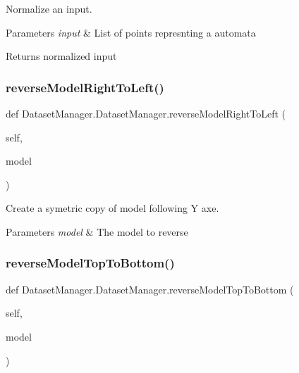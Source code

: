 Normalize an input. 


\begin{DoxyParams}{Parameters}
{\em input} & List of points represnting a automata \\
\hline
\end{DoxyParams}
\begin{DoxyReturn}{Returns}
normalized input 
\end{DoxyReturn}
\mbox{\label{classDatasetManager_1_1DatasetManager_adcd554118e14f508c09e5a1cec76f5c6}} 
\subsubsection{\texorpdfstring{reverseModelRightToLeft()}{reverseModelRightToLeft()}}
{\footnotesize\ttfamily def Dataset\+Manager.\+Dataset\+Manager.\+reverse\+Model\+Right\+To\+Left (\begin{DoxyParamCaption}\item[{}]{self,  }\item[{}]{model }\end{DoxyParamCaption})}



Create a symetric copy of model following Y axe. 


\begin{DoxyParams}{Parameters}
{\em model} & The model to reverse \\
\hline
\end{DoxyParams}
\mbox{\label{classDatasetManager_1_1DatasetManager_aa80b207897d9adf3b805d0185bff4448}} 
\subsubsection{\texorpdfstring{reverseModelTopToBottom()}{reverseModelTopToBottom()}}
{\footnotesize\ttfamily def Dataset\+Manager.\+Dataset\+Manager.\+reverse\+Model\+Top\+To\+Bottom (\begin{DoxyParamCaption}\item[{}]{self,  }\item[{}]{model }\end{DoxyParamCaption})}



